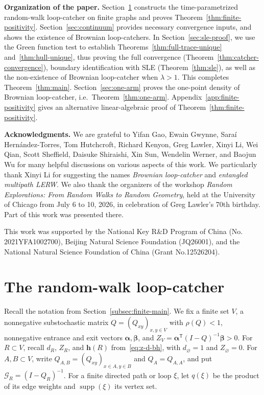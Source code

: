 \documentclass[11pt]{article}
\numberwithin{equation}{section}
\newcommand{\1}{\mathbf{1}}
\newcommand{\supp}{\operatorname{supp}}
\newcommand{\Gc}{\mathcal G}
\newcommand{\balpha}{\boldsymbol{\alpha}}
\newcommand{\bbeta}{\boldsymbol{\beta}}
\newcommand{\bh}{\mathbf h}
\begin{document}
\medskip
\noindent
\textbf{Organization of the paper.}
Section~\ref{sec:finite-positivity} constructs the time-parametrized random-walk loop-catcher on finite graphs and proves Theorem~\ref{thm:finite-positivity}. Section~\ref{sec:continuum} provides necessary convergence inputs, and shows the existence of Brownian loop-catchers. In Section~\ref{sec:sle-proof}, we use the Green function test to establish Theorems~\ref{thm:full-trace-unique} and~\ref{thm:hull-unique}, thus proving the full convergence (Theorem~\ref{thm:catcher-convergence}), boundary identification with SLE (Theorem~\ref{thm:sle}), as well as the non-existence of Brownian loop-catcher when $\lambda>1$. This completes Theorem~\ref{thm:main}. Section~\ref{sec:one-arm} proves the one-point density of Brownian loop-catcher, i.e.~Theorem~\ref{thm:one-arm}. Appendix~\ref{app:finite-positivity} gives an alternative linear-algebraic proof of Theorem~\ref{thm:finite-positivity}.

\medskip
\noindent
\textbf{Acknowledgments.}
We are grateful to Yifan Gao, Ewain Gwynne, Saraí Hernández-Torres, Tom Hutchcroft, Richard Kenyon, Greg Lawler, Xinyi Li, Wei Qian, Scott Sheffield, Daisuke Shiraishi, Xin Sun, Wendelin Werner, and Baojun Wu for many helpful discussions on various aspects of this work. We particularly thank Xinyi Li for suggesting the names \emph{Brownian loop-catcher} and \emph{entangled multipath LERW}. We also thank the organizers of the workshop \emph{Random Explorations: From Random Walks to Random Geometry}, held at the University of Chicago from July 6 to 10, 2026, in celebration of Greg Lawler's 70th birthday. Part of this work was presented there.

This work was supported by the National Key R\&D Program of China (No. 2021YFA1002700), Beijing Natural Science Foundation (JQ26001), and the National Natural Science Foundation of China (Grant No.12526204).


\section{The random-walk loop-catcher}\label{sec:finite-positivity}

Recall the notation from Section~\ref{subsec:finite-main}.  We fix a finite
set $V$, a nonnegative substochastic matrix $Q=(Q_{xy})_{x,y\in V}$ with
$\rho(Q)<1$, nonnegative entrance and exit vectors $\balpha,\bbeta$, and
$Z_V=\balpha^{\mathsf T}(I-Q)^{-1}\bbeta>0$.  For $R\subset V$, recall
$d_R$, $Z_R$, and $\bh(R)$ from~\eqref{eq:z-d-bh}, with
$d_\varnothing=1$ and $Z_\varnothing=0$.  For $A,B\subset V$, write
$Q_{A,B}=(Q_{xy})_{x\in A,y\in B}$ and $Q_A=Q_{A,A}$, and put
$\Gc_R=(I-Q_R)^{-1}$.  For a finite directed path or loop $\xi$, let
$q(\xi)$ be the product of its edge weights and $\supp(\xi)$ its vertex set.
\end{document}
